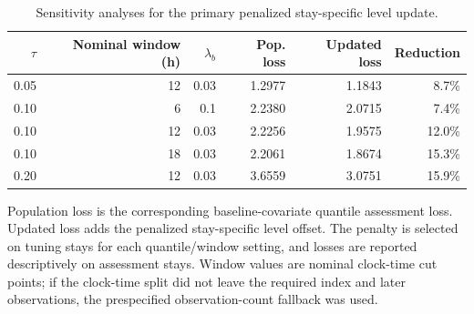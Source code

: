 \begin{table}[!htbp]
\caption{Sensitivity analyses for the primary penalized stay-specific level update.}
\label{tab:sensitivity_analysis}
\centering
\begin{tabular}{rrrrrr}
\hline
$\tau$ & Nominal window (h) & $\lambda_b$ & Pop. loss & Updated loss & Reduction\\
\hline
0.05 & 12 & 0.03 & 1.2977 & 1.1843 & 8.7\%\\
0.10 & 6 & 0.1 & 2.2380 & 2.0715 & 7.4\%\\
0.10 & 12 & 0.03 & 2.2256 & 1.9575 & 12.0\%\\
0.10 & 18 & 0.03 & 2.2061 & 1.8674 & 15.3\%\\
0.20 & 12 & 0.03 & 3.6559 & 3.0751 & 15.9\%\\
\hline
\end{tabular}
\par\smallskip
\footnotesize{Population loss is the corresponding baseline-covariate quantile assessment loss. Updated loss adds the penalized stay-specific level offset. The penalty is selected on tuning stays for each quantile/window setting, and losses are reported descriptively on assessment stays. Window values are nominal clock-time cut points; if the clock-time split did not leave the required index and later observations, the prespecified observation-count fallback was used.}
\end{table}
